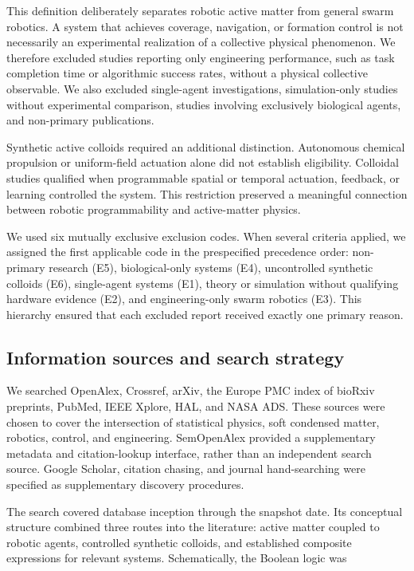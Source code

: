 This definition deliberately separates robotic active matter from
general swarm robotics. A system that achieves coverage, navigation,
or formation control is not necessarily an experimental realization
of a collective physical phenomenon. We therefore excluded studies
reporting only engineering performance, such as task completion time
or algorithmic success rates, without a physical collective
observable. We also excluded single-agent investigations,
simulation-only studies without experimental comparison, studies
involving exclusively biological agents, and non-primary
publications.

Synthetic active colloids required an additional distinction.
Autonomous chemical propulsion or uniform-field actuation alone did
not establish eligibility. Colloidal studies qualified when
programmable spatial or temporal actuation, feedback, or learning
controlled the system. This restriction preserved a meaningful
connection between robotic programmability and active-matter physics.

We used six mutually exclusive exclusion codes. When several
criteria applied, we assigned the first applicable code in the
prespecified precedence order: non-primary research (E5),
biological-only systems (E4), uncontrolled synthetic colloids (E6),
single-agent systems (E1), theory or simulation without qualifying
hardware evidence (E2), and engineering-only swarm robotics (E3).
This hierarchy ensured that each excluded report received exactly
one primary reason.

\subsection{Information sources and search strategy}
\label{sec:methods-search}

We searched OpenAlex, Crossref, arXiv, the Europe PMC index of
bioRxiv preprints, PubMed, IEEE Xplore, HAL, and NASA ADS.
These sources were chosen to cover the intersection of statistical
physics, soft condensed matter, robotics, control, and engineering.
SemOpenAlex provided a supplementary metadata and citation-lookup
interface, rather than an independent search source.
Google Scholar, citation chasing, and journal hand-searching were
specified as supplementary discovery procedures.

The search covered database inception through the snapshot date.
Its conceptual structure combined three routes into the literature:
active matter coupled to robotic agents, controlled synthetic colloids,
and established composite expressions for relevant systems.
Schematically, the Boolean logic was

